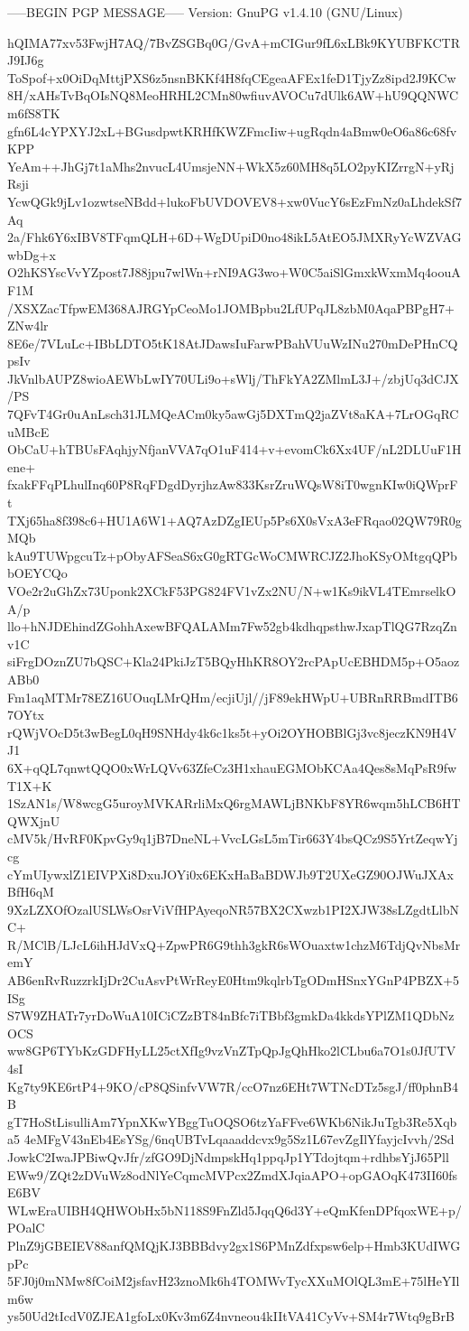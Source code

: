 -----BEGIN PGP MESSAGE-----
Version: GnuPG v1.4.10 (GNU/Linux)

hQIMA77xv53FwjH7AQ/7BvZSGBq0G/GvA+mCIGur9fL6xLBk9KYUBFKCTRJ9IJ6g
ToSpof+x0OiDqMttjPXS6z5nsnBKKf4H8fqCEgeaAFEx1feD1TjyZz8ipd2J9KCw
8H/xAHsTvBqOIsNQ8MeoHRHL2CMn80wfiuvAVOCu7dUlk6AW+hU9QQNWCm6fS8TK
gfn6L4cYPXYJ2xL+BGusdpwtKRHfKWZFmcIiw+ugRqdn4aBmw0eO6a86c68fvKPP
YeAm++JhGj7t1aMhs2nvucL4UmsjeNN+WkX5z60MH8q5LO2pyKIZrrgN+yRjRsji
YcwQGk9jLv1ozwtseNBdd+lukoFbUVDOVEV8+xw0VucY6sEzFmNz0aLhdekSf7Aq
2a/Fhk6Y6xIBV8TFqmQLH+6D+WgDUpiD0no48ikL5AtEO5JMXRyYcWZVAGwbDg+x
O2hKSYscVvYZpost7J88jpu7wlWn+rNI9AG3wo+W0C5aiSlGmxkWxmMq4oouAF1M
/XSXZacTfpwEM368AJRGYpCeoMo1JOMBpbu2LfUPqJL8zbM0AqaPBPgH7+ZNw4lr
8E6e/7VLuLc+IBbLDTO5tK18AtJDawsIuFarwPBahVUuWzINu270mDePHnCQpsIv
JkVnlbAUPZ8wioAEWbLwIY70ULi9o+sWlj/ThFkYA2ZMlmL3J+/zbjUq3dCJX/PS
7QFvT4Gr0uAnLsch31JLMQeACm0ky5awGj5DXTmQ2jaZVt8aKA+7LrOGqRCuMBcE
ObCaU+hTBUsFAqhjyNfjanVVA7qO1uF414+v+evomCk6Xx4UF/nL2DLUuF1Hene+
fxakFFqPLhulInq60P8RqFDgdDyrjhzAw833KsrZruWQsW8iT0wgnKIw0iQWprFt
TXj65ha8f398c6+HU1A6W1+AQ7AzDZgIEUp5Ps6X0sVxA3eFRqao02QW79R0gMQb
kAu9TUWpgcuTz+pObyAFSeaS6xG0gRTGcWoCMWRCJZ2JhoKSyOMtgqQPbbOEYCQo
VOe2r2uGhZx73Uponk2XCkF53PG824FV1vZx2NU/N+w1Ks9ikVL4TEmrselkOA/p
llo+hNJDEhindZGohhAxewBFQALAMm7Fw52gb4kdhqpsthwJxapTlQG7RzqZnv1C
siFrgDOznZU7bQSC+Kla24PkiJzT5BQyHhKR8OY2rcPApUcEBHDM5p+O5aozABb0
Fm1aqMTMr78EZ16UOuqLMrQHm/ecjiUjl//jF89ekHWpU+UBRnRRBmdITB67OYtx
rQWjVOcD5t3wBegL0qH9SNHdy4k6c1ks5t+yOi2OYHOBBlGj3vc8jeczKN9H4VJ1
6X+qQL7qnwtQQO0xWrLQVv63ZfeCz3H1xhauEGMObKCAa4Qes8sMqPsR9fwT1X+K
1SzAN1s/W8wcgG5uroyMVKARrliMxQ6rgMAWLjBNKbF8YR6wqm5hLCB6HTQWXjnU
cMV5k/HvRF0KpvGy9q1jB7DneNL+VvcLGsL5mTir663Y4bsQCz9S5YrtZeqwYjcg
cYmUIywxlZ1EIVPXi8DxuJOYi0x6EKxHaBaBDWJb9T2UXeGZ90OJWuJXAxBfH6qM
9XzLZXOfOzalUSLWsOsrViVfHPAyeqoNR57BX2CXwzb1PI2XJW38sLZgdtLlbNC+
R/MClB/LJcL6ihHJdVxQ+ZpwPR6G9thh3gkR6sWOuaxtw1chzM6TdjQvNbsMremY
AB6enRvRuzzrkIjDr2CuAsvPtWrReyE0Htm9kqlrbTgODmHSnxYGnP4PBZX+5ISg
S7W9ZHATr7yrDoWuA10ICiCZzBT84nBfc7iTBbf3gmkDa4kkdsYPlZM1QDbNzOCS
ww8GP6TYbKzGDFHyLL25ctXfIg9vzVnZTpQpJgQhHko2lCLbu6a7O1s0JfUTV4sI
Kg7ty9KE6rtP4+9KO/cP8QSinfvVW7R/ccO7nz6EHt7WTNcDTz5sgJ/ff0phnB4B
gT7HoStLisulliAm7YpnXKwYBggTuOQSO6tzYaFFve6WKb6NikJuTgb3Re5Xqba5
4eMFgV43nEb4EsYSg/6nqUBTvLqaaaddcvx9g5Sz1L67evZgIlYfayjcIvvh/2Sd
JowkC2IwaJPBiwQvJfr/zfGO9DjNdmpskHq1ppqJp1YTdojtqm+rdhbsYjJ65Pll
EWw9/ZQt2zDVuWz8odNlYeCqmcMVPcx2ZmdXJqiaAPO+opGAOqK473II60fsE6BV
WLwEraUIBH4QHWObHx5bN118S9FnZld5JqqQ6d3Y+eQmKfenDPfqoxWE+p/POalC
PlnZ9jGBEIEV88anfQMQjKJ3BBBdvy2gx1S6PMnZdfxpsw6elp+Hmb3KUdIWGpPc
5FJ0j0mNMw8fCoiM2jsfavH23znoMk6h4TOMWvTycXXuMOlQL3mE+75lHeYIlm6w
ys50Ud2tIcdV0ZJEA1gfoLx0Kv3m6Z4nvneou4kIItVA41CyVv+SM4r7Wtq9gBrB
